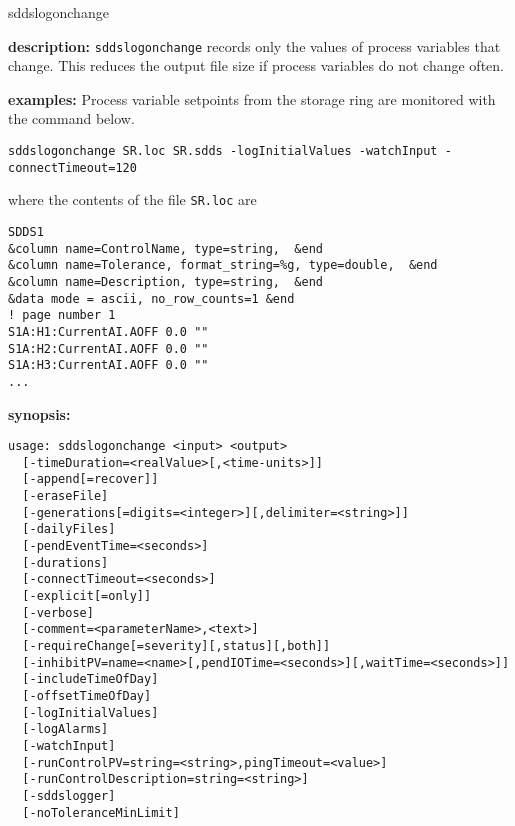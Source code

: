 \begin{sddsprog}{sddslogonchange}
\item \textbf{description:}
\verb+sddslogonchange+ records only the values of process variables that change. This reduces the output file size if process variables do not change often.
\item \textbf{examples:} 
% 
Process variable setpoints from the storage ring are monitored
with the command below.
\begin{verbatim}
sddslogonchange SR.loc SR.sdds -logInitialValues -watchInput -connectTimeout=120
\end{verbatim}
where the contents of the file \verb+SR.loc+ are
\begin{verbatim}
SDDS1
&column name=ControlName, type=string,  &end
&column name=Tolerance, format_string=%g, type=double,  &end
&column name=Description, type=string,  &end
&data mode = ascii, no_row_counts=1 &end
! page number 1
S1A:H1:CurrentAI.AOFF 0.0 ""
S1A:H2:CurrentAI.AOFF 0.0 ""
S1A:H3:CurrentAI.AOFF 0.0 ""
...
\end{verbatim}
\item \textbf{synopsis:} 
\begin{verbatim}
usage: sddslogonchange <input> <output> 
  [-timeDuration=<realValue>[,<time-units>]]
  [-append[=recover]] 
  [-eraseFile]
  [-generations[=digits=<integer>][,delimiter=<string>]]
  [-dailyFiles]
  [-pendEventTime=<seconds>] 
  [-durations] 
  [-connectTimeout=<seconds>]
  [-explicit[=only]] 
  [-verbose] 
  [-comment=<parameterName>,<text>]
  [-requireChange[=severity][,status][,both]]
  [-inhibitPV=name=<name>[,pendIOTime=<seconds>][,waitTime=<seconds>]]
  [-includeTimeOfDay] 
  [-offsetTimeOfDay]
  [-logInitialValues]
  [-logAlarms]
  [-watchInput]
  [-runControlPV=string=<string>,pingTimeout=<value>]
  [-runControlDescription=string=<string>]
  [-sddslogger]
  [-noToleranceMinLimit]


\end{verbatim}
\end{sddsprog}
